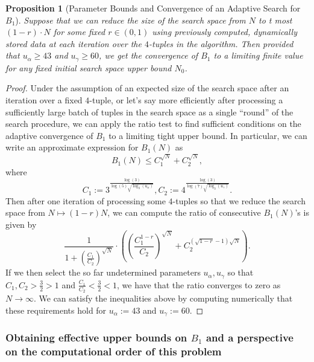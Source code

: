 \documentclass[12pt]{article}
\newtheorem{prop}[theorem]{Proposition}
\begin{document}
\begin{prop}[Parameter Bounds and Convergence of an Adaptive Search for $B_1$] 
\label{prop_ConvOfAdaptiveSearch} 
Suppose that we can reduce the size of the search space from $N$ to t most 
$(1-r) \cdot N$ for some fixed $r \in (0, 1)$ 
using previously computed, dynamically stored data at each iteration over the $4$-tuples in the 
algorithm. Then provided that $u_{\alpha} \geq 43$ and $u_{\gamma} \geq 60$, we get the 
convergence of $B_1$ to a limiting finite value 
for any fixed initial search space upper bound $N_0$. 
\end{prop} 
\begin{proof} 
Under the assumption of an expected size of the search space after an iteration over a fixed $4$-tuple, or 
let's say more efficiently after processing a sufficiently large batch of tuples in the search space as a 
single ``round'' of the search procedure, we can apply the ratio test to find sufficient conditions 
on the adaptive convergence of $B_1$ to a limiting tight upper bound. 
In particular, we can write an approximate expression for $B_1(N)$ as 
\[
B_1(N) \leq C_1^{\sqrt{N}} + C_2^{\sqrt{N}}, 
\]
where $$C_1 := 3^{\frac{\log(3)}{\log(5) \sqrt{\log_3(u_{\alpha})}}},
C_2 := 4^{\frac{\log(3)}{\log(7) \sqrt{\log_3(u_{\gamma})}}}.$$
Then after one iteration of processing some $4$-tuples so that we reduce the search space from 
$N \mapsto (1-r)N$, we can compute the ratio of consecutive $B_1(N)$'s is given by 
\[
\frac{1}{1+\left(\frac{C_1}{C_2}\right)^{\sqrt{N}}} \cdot \left( 
     \left(\frac{C_1^{1-r}}{C_2}\right)^{\sqrt{N}} + C_2^{(\sqrt{1-r}-1)\sqrt{N}}\right). 
\] 
If we then select the so far undetermined parameters $u_{\alpha},u_{\gamma}$ so that 
$C_1,C_2>\frac{3}{2}>1$ and $\frac{C_1}{C_2} < \frac{3}{2} < 1$, we have that the ratio converges to 
zero as $N \rightarrow \infty$. 
We can satisfy the inequalities above by computing numerically that these requirements hold 
for $u_{\alpha} := 43$ and $u_{\gamma} := 60$. 
\end{proof} 

\subsubsection{Obtaining effective upper bounds on $B_1$ and a perspective on the computational 
     order of this problem} 
\end{document}

